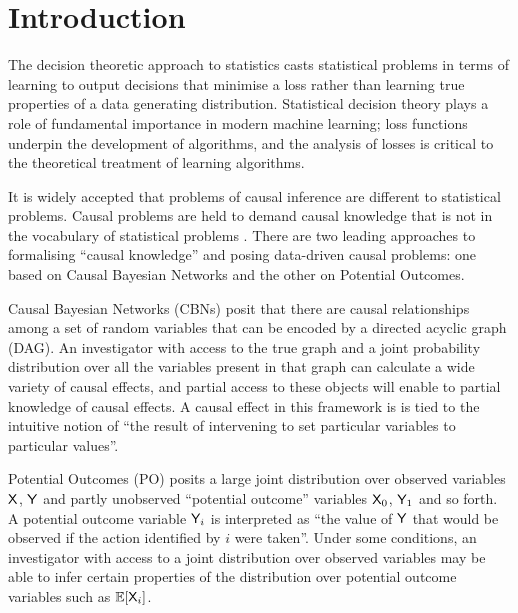 \section{Introduction}



The decision theoretic approach to statistics casts statistical problems in terms of learning to output decisions that minimise a loss rather than learning true properties of a data generating distribution. Statistical decision theory plays a role of fundamental importance in modern machine learning; loss functions underpin the development of algorithms, and the analysis of losses is critical to the theoretical treatment of learning algorithms.

It is widely accepted that problems of causal inference are different to statistical problems. Causal problems are held to demand causal knowledge that is not in the vocabulary of statistical problems \citep{pearl_causality:_2009,cartwright_no_1994}. There are two leading approaches to formalising ``causal knowledge'' and posing data-driven causal problems: one based on Causal Bayesian Networks and the other on Potential Outcomes.

Causal Bayesian Networks (CBNs) posit that there are causal relationships among a set of random variables that can be encoded by a directed acyclic graph (DAG). An investigator with access to the true graph and a joint probability distribution over all the variables present in that graph can calculate a wide variety of causal effects, and partial access to these objects will enable to partial knowledge of causal effects. A causal effect in this framework is is tied to the intuitive notion of ``the result of intervening to set particular variables to particular values''.

Potential Outcomes (PO) posits a large joint distribution over observed variables $\mathsf{X}$, $\mathsf{Y}$ and partly unobserved ``potential outcome'' variables $\mathsf{X}_0$, $\mathsf{Y}_1$ and so forth. A potential outcome variable $\mathsf{Y}_i$ is interpreted as ``the value of $\mathsf{Y}$ that would be observed if the action identified by $i$ were taken''. Under some conditions, an investigator with access to a joint distribution over observed variables may be able to infer certain properties of the distribution over potential outcome variables such as $\mathbb{E}[\mathsf{X}_i]$.

